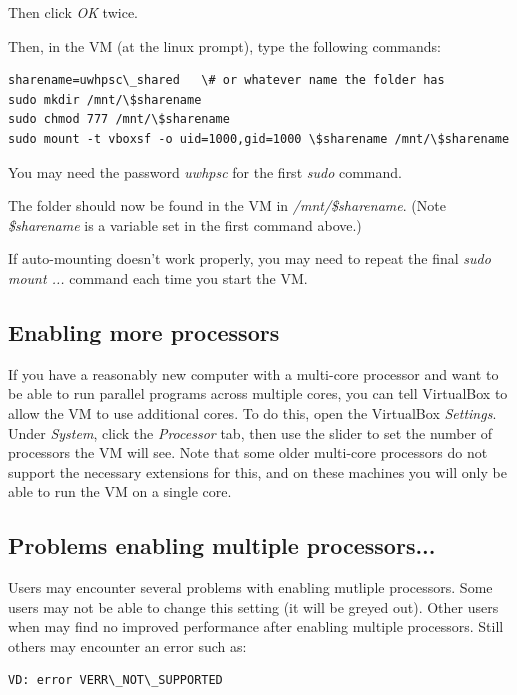 \documentclass[letterpaper,10pt,english]{sphinxmanual}
\begin{document}
Then click \emph{OK} twice.

Then, in the VM (at the linux prompt), type the following commands:

\begin{Verbatim}[commandchars=\\\{\}]
sharename=uwhpsc\_shared   \# or whatever name the folder has
sudo mkdir /mnt/\$sharename
sudo chmod 777 /mnt/\$sharename
sudo mount -t vboxsf -o uid=1000,gid=1000 \$sharename /mnt/\$sharename
\end{Verbatim}

You may need the password \emph{uwhpsc} for the first \emph{sudo} command.

The folder should now be found in the VM in \emph{/mnt/\$sharename}.
(Note \emph{\$sharename} is a variable set in the first command above.)

If auto-mounting doesn't work properly, you may need to repeat the final
\emph{sudo mount ...} command  each time you start the VM.


\subsection{Enabling more processors}
\label{vm:enabling-more-processors}
If you have a reasonably new computer with a multi-core
processor and want to be able to run parallel programs across multiple
cores, you can tell VirtualBox to allow the VM to use additional
cores.  To do this, open the VirtualBox
\emph{Settings}.  Under \emph{System}, click the \emph{Processor}
tab, then use the slider to set the number of processors the VM will
see.  Note that some older multi-core processors do not support the
necessary extensions for this, and on these machines you will only be
able to run the VM on a single core.


\subsection{Problems enabling multiple processors...}
\label{vm:problems-enabling-multiple-processors}
Users may encounter several problems with enabling mutliple processors. Some users may not
be able to change this setting (it will be greyed out). Other users when may find no improved performance after enabling multiple processors. Still others may encounter an error such as:

\begin{Verbatim}[commandchars=\\\{\}]
VD: error VERR\_NOT\_SUPPORTED
\end{Verbatim}
\end{document}
